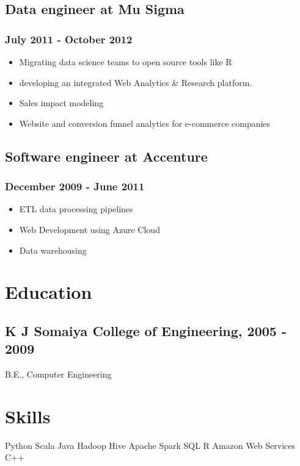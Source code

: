 \documentclass[letterpaper]{article}
\begin{document}
\subsection{Data engineer at Mu Sigma}
\label{sec:Data-engineer-at-Mu-Sigma}
\subsubsection{July 2011 - October 2012}
\label{sec:July-2011-October-2012}
\begin{itemize}
\item Migrating data science teams to open source tools like R
\item developing an integrated Web Analytics \& Research platform.
\item Sales impact modeling
\item Website and conversion funnel analytics for e-commerce companies
\end{itemize}
\subsection{Software engineer at Accenture}
\label{sec:Software-engineer-at-Accenture}
\subsubsection{December 2009 - June 2011}
\label{sec:December-2009-June-2011}
\begin{itemize}
\item ETL data processing pipelines
\item Web Development using Azure Cloud
\item Data warehousing
\end{itemize}
\section{Education}
\label{sec:Education}
\subsection{K J Somaiya College of Engineering, 2005 - 2009}
\label{sec:K-J-Somaiya-College-of-Engineering-2005-2009}
B.E., Computer Engineering
\section{Skills}
\label{sec:Skills}
Python
Scala
Java
Hadoop
Hive
Apache Spark
SQL
R
Amazon Web Services
C++
\end{document}
